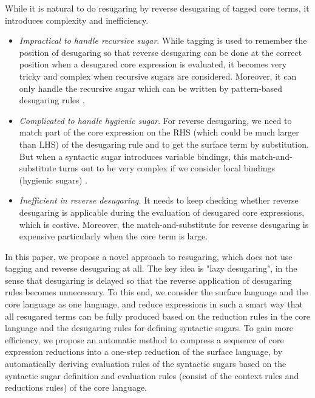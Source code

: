 While it is natural to do resugaring by reverse desugaring of tagged core terms, it introduces complexity and inefficiency.
\begin{itemize}
\item {\em Impractical to handle recursive sugar}. While tagging is used to remember the position of desugaring so that reverse desugaring can be done at the correct position when a desugared core expression is evaluated, it  becomes very tricky and complex when recursive sugars are considered. Moreover, it can only handle the recursive sugar which can be written by pattern-based desugaring rules \cite{resugaring}.%

\item {\em Complicated to handle hygienic sugar}. For reverse desugaring, we need to match part of the core expression on the RHS (which could be much larger than LHS) of the desugaring rule and to get the surface term by substitution. But when a syntactic sugar introduces variable bindings, this match-and-substitute turns out to be very complex if we consider local bindings (hygienic sugars) \cite{hygienic}.

\item {\em Inefficient in reverse desugaring.} It needs to keep checking whether reverse desugaring is applicable during the evaluation of desugared core expressions, which is costive. Moreover, the match-and-substitute for reverse desugaring is expensive particularly when the core term is large.

\end{itemize}

In this paper, we propose a novel approach to resugaring, which does not use tagging and reverse desugaring at all.
The key idea is "lazy desugaring", in the sense that desugaring is delayed so that the reverse application of desugaring rules becomes unnecessary.
To this end, we consider the surface language and the core language as one language, and reduce expressions in such a smart way that all resugared terms can be fully produced based on the reduction rules in the core language and  the desugaring rules for defining syntactic sugars. To gain more efficiency, we propose an automatic method to compress a sequence of core expression reductions into a one-step reduction of the surface language, by automatically deriving evaluation rules of the syntactic sugars based on the syntactic sugar definition and evaluation rules (consist of the context rules and reductions rules) of the core language.


